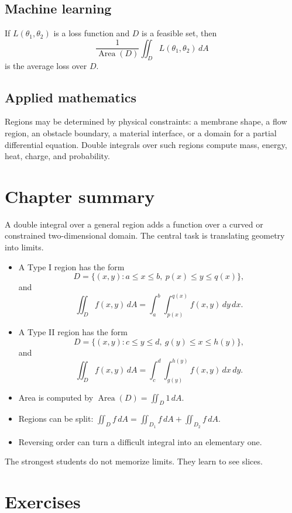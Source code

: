 \documentclass[11pt]{article}
\newcommand{\Area}{\operatorname{Area}}
\begin{document}
\subsection*{Machine learning}
If $L(\theta_1,\theta_2)$ is a loss function and $D$ is a feasible set, then
\[
\frac{1}{\Area(D)}\iint_D L(\theta_1,\theta_2)\,dA
\]
is the average loss over $D$.

\subsection*{Applied mathematics}
Regions may be determined by physical constraints: a membrane shape, a flow region, an obstacle boundary, a material interface, or a domain for a partial differential equation. Double integrals over such regions compute mass, energy, heat, charge, and probability.

\section{Chapter summary}

A double integral over a general region adds a function over a curved or constrained two-dimensional domain. The central task is translating geometry into limits.

\begin{itemize}
  \item A Type I region has the form
  \[
  D=\{(x,y):a\le x\le b,\ p(x)\le y\le q(x)\},
  \]
  and
  \[
  \iint_D f(x,y)\,dA=\int_a^b\int_{p(x)}^{q(x)}f(x,y)\,dy\,dx.
  \]
  \item A Type II region has the form
  \[
  D=\{(x,y):c\le y\le d,\ g(y)\le x\le h(y)\},
  \]
  and
  \[
  \iint_D f(x,y)\,dA=\int_c^d\int_{g(y)}^{h(y)}f(x,y)\,dx\,dy.
  \]
  \item Area is computed by $\Area(D)=\iint_D1\,dA$.
  \item Regions can be split: $\iint_D f\,dA=\iint_{D_1}f\,dA+\iint_{D_2}f\,dA$.
  \item Reversing order can turn a difficult integral into an elementary one.
\end{itemize}

The strongest students do not memorize limits. They learn to see slices.

\section{Exercises}
\end{document}

